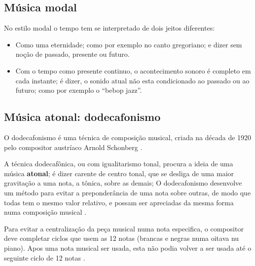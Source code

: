 \subsection{Música modal}
\label{sec:MusicaModal}

No estilo modal o tempo tem se interpretado de dois jeitos diferentes:
\begin{itemize}
\item Como uma eternidade; como por exemplo no canto gregoriano; e dizer 
sem noção de passado, presente ou futuro.
\item Com o tempo como presente continuo, 
o acontecimento sonoro é completo em cada instante; é dizer,
 o sonido atual não esta condicionado ao passado ou ao futuro;
como por exemplo o ``bebop jazz''\cite[pp. 156]{arbones2012armonia}.
\end{itemize}



\subsection{Música atonal: dodecafonismo}
\label{sec:MusicaAtonal}
O dodecafonismo é uma técnica de composição musical, 
criada na década de 1920 pelo compositor austríaco Arnold Schonberg \cite[pp. 121]{arbones2012armonia}\cite[pp. 263]{holst1998abc}.


A técnica dodecafônica, ou com igualitarismo tonal,
procura a ideia de uma música \textbf{atonal}; é dizer carente de centro tonal,
que se desliga de uma maior gravitação a uma nota, a tônica, sobre as demais;
O dodecafonismo desenvolve um método para evitar a preponderância de uma nota sobre outras,
de modo que todas tem o mesmo valor relativo,
e possam ser apreciadas da mesma forma numa composição musical 
\cite[pp. 122]{arbones2012armonia}.

Para evitar a centralização da peça musical numa nota especifica,
o compositor deve completar ciclos que usem as 12 notas 
(brancas e negras numa oitava nu piano). 
Apos uma nota musical ser usada, 
esta não podia volver a ser usada até o seguinte ciclo de 12 notas \cite[pp. 123]{arbones2012armonia}.


